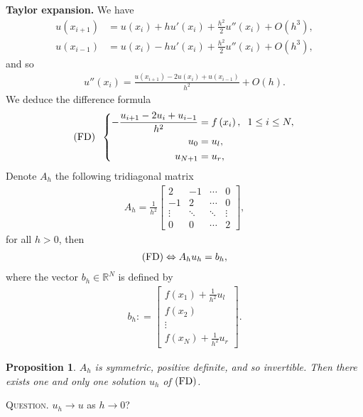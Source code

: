 \documentclass[11pt,a4paper,center,notitlepage]{article}
\numberwithin{equation}{section}
\newtheorem{prop}{Proposition}[section]
\begin{document}
\noindent
\textbf{Taylor expansion.} We have
\begin{align}
u\left( {{x_{i + 1}}} \right) &= u\left( {{x_i}} \right) + hu'\left( {{x_i}} \right) + \frac{{{h^2}}}{2}u''\left( {{x_i}} \right) + O\left( {{h^3}} \right),\\
u\left( {{x_{i - 1}}} \right) &= u\left( {{x_i}} \right) - hu'\left( {{x_i}} \right) + \frac{{{h^2}}}{2}u''\left( {{x_i}} \right) + O\left( {{h^3}} \right),
\end{align}
and so
\begin{align}
u''\left( {{x_i}} \right) = \frac{{u\left( {{x_{i + 1}}} \right) - 2u\left( {{x_i}} \right) + u\left( {{x_{i - 1}}} \right)}}{{{h^2}}} + O\left( h \right).
\end{align}
We deduce the difference formula
\begin{equation*}
\left({\rm FD} \right)\hspace{2mm}\left\{ \begin{split}
 - \frac{{{u_{i + 1}} - 2{u_i} + {u_{i - 1}}}}{{{h^2}}} &= f\left( {{x_i}} \right),\hspace{2mm}1 \le i \le N,\\
{u_0} &= {u_l},\\
{u_{N + 1}} &= {u_r},
\end{split} \right.
\end{equation*}
Denote $A_h$ the following tridiagonal matrix
\begin{align}
{A_h} = \frac{1}{{{h^2}}}\left[ {\begin{array}{*{20}{c}}
2&{ - 1}& \cdots &0\\
{ - 1}&2& \cdots &0\\
 \vdots & \ddots & \ddots & \vdots \\
0&0& \cdots &2
\end{array}} \right],
\end{align}
for all $h>0$, then 
\begin{align}
\left( {\rm FD} \right) \Leftrightarrow {A_h}{u_h} = {b_h},
\end{align}
where the vector $b_h \in \mathbb{R}^N$ is defined by
\begin{align}
{b_h}: = \left[ {\begin{array}{*{20}{c}}
{f\left( {{x_1}} \right) + \frac{1}{{{h^2}}}{u_l}}\\
{f\left( {{x_2}} \right)}\\
 \vdots \\
{f\left( {{x_N}} \right) + \frac{1}{{{h^2}}}{u_r}}
\end{array}} \right].
\end{align}
\begin{prop}
$A_h$ is symmetric, positive definite, and so invertible. Then there exists one and only one solution $u_h$ of $\left( {\rm FD}\right)$. 
\end{prop}
\noindent
\textsc{Question.} $u_h \to u$ as $h\to 0$?
\end{document}
